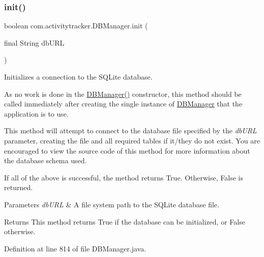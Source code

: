 \subsubsection{\texorpdfstring{init()}{init()}}
{\footnotesize\ttfamily boolean com.\+activitytracker.\+D\+B\+Manager.\+init (\begin{DoxyParamCaption}\item[{final String}]{db\+U\+RL }\end{DoxyParamCaption})\hspace{0.3cm}{\ttfamily [package]}}

Initializes a connection to the S\+Q\+Lite database.

As no work is done in the \mbox{\hyperlink{classcom_1_1activitytracker_1_1_d_b_manager_ac1f558ef56fe02d74fe103a473a15bb5}{D\+B\+Manager()}} constructor, this method should be called immediately after creating the single instance of \mbox{\hyperlink{classcom_1_1activitytracker_1_1_d_b_manager}{D\+B\+Manager}} that the application is to use.

This method will attempt to connect to the database file specified by the {\itshape db\+U\+RL} parameter, creating the file and all required tables if it/they do not exist. You are encouraged to view the source code of this method for more information about the database schema used.

If all of the above is successful, the method returns True. Otherwise, False is returned.


\begin{DoxyParams}{Parameters}
{\em db\+U\+RL} & A file system path to the S\+Q\+Lite database file.\\
\hline
\end{DoxyParams}
\begin{DoxyReturn}{Returns}
This method returns True if the database can be initialized, or False otherwise. 
\end{DoxyReturn}


Definition at line 814 of file D\+B\+Manager.\+java.


